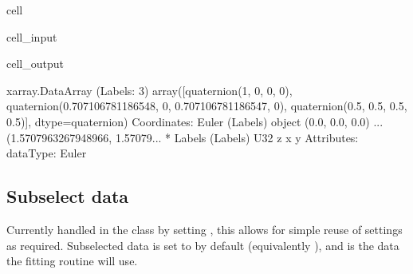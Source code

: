 \documentclass[letterpaper,table,10pt,english]{jupyterBook}
\begin{document}
\begin{sphinxuseclass}{cell}\begin{sphinxVerbatimInput}

\begin{sphinxuseclass}{cell_input}
\begin{sphinxVerbatim}[commandchars=\\\{\}]
\PYG{p}{[}\PYG{p}{]}\PYG{p}{[}\PYG{p}{]}
\end{sphinxVerbatim}

\end{sphinxuseclass}\end{sphinxVerbatimInput}
\begin{sphinxVerbatimOutput}

\begin{sphinxuseclass}{cell_output}
\begin{sphinxVerbatim}[commandchars=\\\{\}]
\PYGZlt{}xarray.DataArray (Labels: 3)\PYGZgt{}
array([quaternion(1, \PYGZhy{}0, 0, 0),
       quaternion(0.707106781186548, \PYGZhy{}0, 0.707106781186547, 0),
       quaternion(0.5, \PYGZhy{}0.5, 0.5, 0.5)], dtype=quaternion)
Coordinates:
    Euler    (Labels) object (0.0, 0.0, 0.0) ... (1.5707963267948966, 1.57079...
  * Labels   (Labels) \PYGZlt{}U32 \PYGZsq{}z\PYGZsq{} \PYGZsq{}x\PYGZsq{} \PYGZsq{}y\PYGZsq{}
Attributes:
    dataType:  Euler
\end{sphinxVerbatim}

\end{sphinxuseclass}\end{sphinxVerbatimOutput}

\end{sphinxuseclass}

\subsection{Subselect data}
\label{\detokenize{part2/basic_fitting_numerics_intro_260723:subselect-data}}
\sphinxAtStartPar
Currently handled in the class by setting , this allows for simple reuse of settings as required. Subselected data is set to  by default (equivalently ), and is the data the fitting routine will use.
\end{document}
